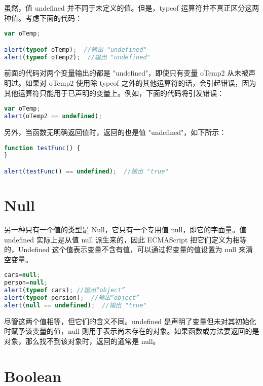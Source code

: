 虽然，值 undefined 并不同于未定义的值。但是，typeof 运算符并不真正区分这两种值。考虑下面的代码：


\begin{lstlisting}[language=JavaScript]
var oTemp;

alert(typeof oTemp);  //输出 "undefined"
alert(typeof oTemp2);  //输出 "undefined"
\end{lstlisting}


前面的代码对两个变量输出的都是 "undefined"，即使只有变量 oTemp2 从未被声明过。如果对 oTemp2 使用除 typeof 之外的其他运算符的话，会引起错误，因为其他运算符只能用于已声明的变量上。例如，下面的代码将引发错误：

\begin{lstlisting}[language=JavaScript]
var oTemp;
alert(oTemp2 == undefined);
\end{lstlisting}

另外，当函数无明确返回值时，返回的也是值 "undefined"，如下所示：



\begin{lstlisting}[language=JavaScript]
function testFunc() {
}

alert(testFunc() == undefined);  //输出 "true"
\end{lstlisting}


\section{Null}


另一种只有一个值的类型是 Null，它只有一个专用值 null，即它的字面量。值 undefined 实际上是从值 null 派生来的，因此 ECMAScript 把它们定义为相等的，Undefined 这个值表示变量不含有值，可以通过将变量的值设置为 null 来清空变量。



\begin{lstlisting}[language=JavaScript]
cars=null;
person=null;
alert(typeof cars);	//输出“object”
alert(typeof persion);	//输出“object”
alert(null == undefined);  //输出 "true"
\end{lstlisting}

尽管这两个值相等，但它们的含义不同。undefined 是声明了变量但未对其初始化时赋予该变量的值，null 则用于表示尚未存在的对象。如果函数或方法要返回的是对象，那么找不到该对象时，返回的通常是 null。





\section{Boolean}



